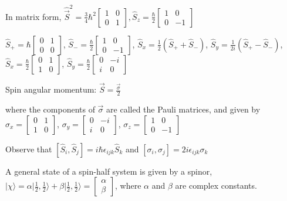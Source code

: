 In matrix form, $\widehat{\vec{S}}^2 = \frac{3}{4} \hbar^2 \begin{bmatrix} 1 & 0 \\ 0 & 1 \end{bmatrix}, \widehat{S}_z = \frac{\hbar}{2} \begin{bmatrix} 1 & 0 \\ 0 & -1 \end{bmatrix}$

$\widehat{S}_{+} = \hbar \begin{bmatrix} 0 & 1 \\ 0 & 0 \end{bmatrix}$, $\widehat{S}_{-} = \frac{\hbar}{2} \begin{bmatrix} 1 & 0 \\ 0 & -1 \end{bmatrix}$, $\widehat{S}_x = \frac{1}{2}(\widehat{S}_{+} + \widehat{S}_{-})$, $\widehat{S}_y = \frac{1}{2i}(\widehat{S}_{+} - \widehat{S}_{-})$, $\widehat{S}_x = \frac{\hbar}{2} \begin{bmatrix} 0 & 1 \\ 1 & 0 \end{bmatrix}$, $\widehat{S}_y = \frac{\hbar}{2} \begin{bmatrix} 0 & -i \\ i & 0 \end{bmatrix}$

Spin angular momentum: $\vec{S} = \frac{\vec{\sigma}}{2}$

where the components of $\vec{\sigma}$ are called the Pauli matrices, and given by $\sigma_x = \begin{bmatrix} 0 & 1 \\ 1 & 0 \end{bmatrix}$, $\sigma_y = \begin{bmatrix} 0 & -i \\ i & 0 \end{bmatrix}$, $\sigma_z = \begin{bmatrix} 1 & 0 \\ 0 & -1 \end{bmatrix}$

Observe that $[\widehat{S}_i, \widehat{S}_j] = i \hbar \epsilon_{ijk} \widehat{S}_k$ and $[\sigma_i, \sigma_j] = 2 i \epsilon_{ijk} \sigma_k$

A general state of a spin-half system is given by a spinor, $|\chi \rangle = \alpha | \frac{1}{2}, \frac{1}{2} \rangle + \beta | \frac{1}{2}, \frac{1}{2} \rangle = \begin{bmatrix} \alpha \\ \beta \end{bmatrix}$, where $\alpha$ and $\beta$ are complex constants.

